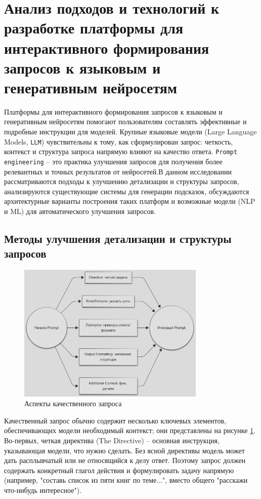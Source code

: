\section{Анализ подходов и технологий к разработке платформы
для интерактивного формирования запросов к языковым и генеративным
нейросетям}
\label{sec:analysis}
Платформы для интерактивного формирования запросов к языковым и генеративным нейросетям помогают пользователям составлять эффективные и подробные инструкции для моделей. Крупные языковые модели (Large Language Models, \texttt{LLM}) чувствительны к тому, как сформулирован запрос: четкость, контекст и структура запроса напрямую влияют на качество ответа. \texttt{Prompt engineering} – это практика улучшения запросов для получения более релевантных и точных результатов от нейросетей\cite{lakera:2025}.В данном исследовании рассматриваются подходы к улучшению детализации и структуры запросов, анализируются существующие системы для генерации подсказок, обсуждаются архитектурные варианты построения таких платформ и возможные модели (NLP и ML) для автоматического улучшения запросов.
\subsection{Методы улучшения детализации и структуры запросов}
\begin{figure}[htbp]
    \centering
    \includegraphics[width=0.8\textwidth]{picture/diploma_prompt_structure.png}
    \caption{Аспекты качественного запроса}
    \label{prompt_quality_props}
\end{figure}
Качественный запрос обычно содержит несколько ключевых элементов, обеспечивающих модели необходимый контекст\cite{learnprompt:promptstructure}; они представлены на рисунке \ref{prompt_quality_props}. 
Во-первых, четкая директива (The Directive) – основная инструкция, указывающая модели, что нужно сделать.
Без ясной директивы модель может дать расплывчатый или не относящийся к делу ответ\cite{learnprompt:promptstructure}. Поэтому запрос должен содержать конкретный глагол действия и формулировать задачу напрямую (например, "составь список из пяти книг по теме...", вместо общего "расскажи что-нибудь интересное").

